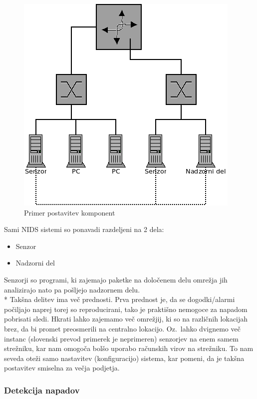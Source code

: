 \documentclass[12pt]{article}
\begin{document}
\begin{figure}[htb]
\begin{center}
\includegraphics[scale=0.5]{komponente.png}
\end{center}
\caption{Primer postavitev komponent}
\label{komponente}
\end{figure}

Sami NIDS sistemi so ponavadi razdeljeni na 2 dela:
\begin{itemize}
    \item Senzor
    \item Nadzorni del
\end{itemize}

Senzorji so programi, ki zajemajo paketke na določenem delu omrežja jih analizirajo nato pa pošljejo nadzornem delu.
\\*
Takšna delitev ima več prednosti. Prva prednost je, da se dogodki/alarmi počiljajo naprej torej so reproducirani, tako je praktišno nemogoce za napadom pobrisati sledi.
Hkrati lahko zajemamo več omrežjij, ki so na različnih lokacijah brez, da bi promet preosmerili na centralno lokacijo.
Oz.\ lahko dvignemo več instanc (slovenski prevod primerek je neprimeren) senzorjev na enem samem strežniku, kar nam omogoča bolšo uporabo računskih virov na strežniku.
To nam seveda oteži samo nastavitev (konfiguracijo) sistema, kar pomeni, da je takšna postavitev smiselna za večja podjetja.


\subsubsection{Detekcija napadov} %
\end{document}
